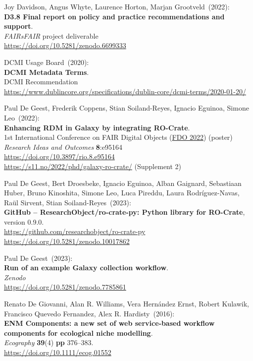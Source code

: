 \begin{thebibliography}{9}
Joy Davidson, Angus Whyte, Laurence Horton, Marjan Grootveld~(2022): \\
\textbf{D3.8 Final report on policy and practice recommendations and support}.\\
\emph{FAIRsFAIR} project deliverable \\
\url{https://doi.org/10.5281/zenodo.6699333}

DCMI Usage Board~(2020): \\
\textbf{DCMI Metadata Terms}. \\
DCMI Recommendation\\
\url{https://www.dublincore.org/specifications/dublin-core/dcmi-terms/2020-01-20/}

Paul De Geest, Frederik Coppens, Stian Soiland-Reyes, Ignacio Eguinoa, Simone Leo~(2022): \\
\textbf{Enhancing RDM in Galaxy by integrating RO-Crate}.\\
1st International Conference on FAIR Digital Objects
(\href{https://www.fdo2022.org/}{FDO 2022}) (poster)\\
\emph{Research Ideas and Outcomes} \textbf{8}:e95164\\
\url{https://doi.org/10.3897/rio.8.e95164}\\
\url{https://s11.no/2022/phd/galaxy-ro-crate/} (Supplement 2)

Paul De Geest, Bert Droesbeke, Ignacio Eguinoa, Alban Gaignard, Sebastiaan Huber, Bruno Kinoshita, Simone Leo, Luca Pireddu, Laura Rodríguez-Navas, Raül Sirvent, Stian Soiland-Reyes~(2023): \\
\textbf{GitHub -- ResearchObject/ro-crate-py: Python library for RO-Crate}, version 0.9.0.\\
\url{https://github.com/researchobject/ro-crate-py}\\
\url{https://doi.org/10.5281/zenodo.10017862}

Paul De Geest~(2023): \\
\textbf{Run of an example Galaxy collection workflow}.\\
\emph{Zenodo}\\
\url{https://doi.org/10.5281/zenodo.7785861}

Renato De Giovanni, Alan R. Williams, Vera Hernández Ernst, Robert Kulawik, Francisco Quevedo Fernandez, Alex R. Hardisty~(2016): \\
\textbf{ENM Components: a new set of web service‐based workflow components for ecological niche modelling}.\\
\emph{Ecography}
\textbf{39}(4) \textbf{pp} 376--383.\\
\url{https://doi.org/10.1111/ecog.01552}


\end{thebibliography}

